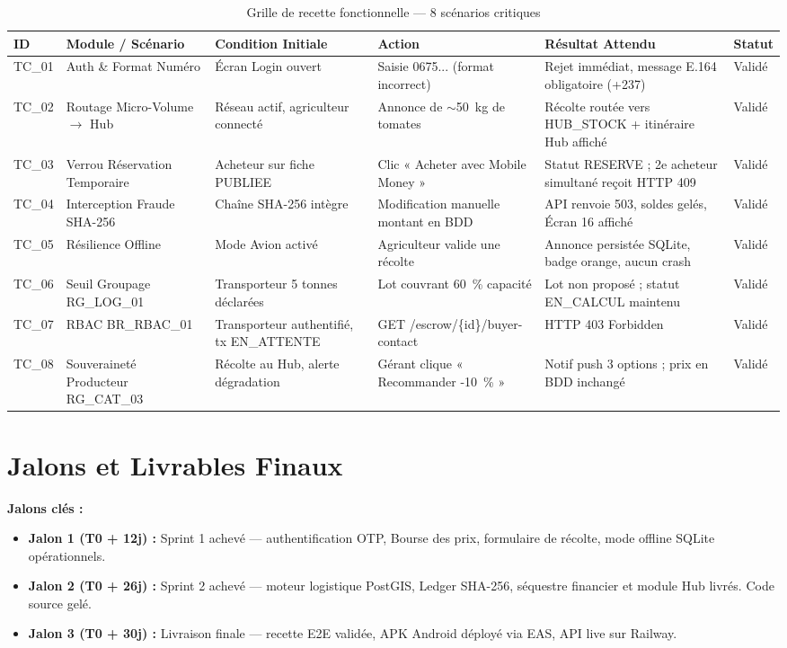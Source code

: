 \documentclass[12pt,a4paper]{report}
\begin{document}
\begin{table}[H]
\centering
\caption{Grille de recette fonctionnelle — 8 scénarios critiques}
\scriptsize
\begin{tabularx}{\textwidth}{C{1cm} L{2.8cm} L{2.5cm} L{2.5cm} L{3cm} C{1.2cm}}
\toprule
\textbf{ID} & \textbf{Module / Scénario} & \textbf{Condition Initiale} & \textbf{Action} & \textbf{Résultat Attendu} & \textbf{Statut} \\
\midrule
TC\_01 & Auth \& Format Numéro & Écran Login ouvert & Saisie 0675... (format incorrect) & Rejet immédiat, message E.164 obligatoire (+237) & Validé \\
TC\_02 & Routage Micro-Volume $\to$ Hub & Réseau actif, agriculteur connecté & Annonce de $\sim$50~kg de tomates & Récolte routée vers HUB\_STOCK + itinéraire Hub affiché & Validé \\
TC\_03 & Verrou Réservation Temporaire & Acheteur sur fiche PUBLIEE & Clic « Acheter avec Mobile Money » & Statut RESERVE ; 2e acheteur simultané reçoit HTTP 409 & Validé \\
TC\_04 & Interception Fraude SHA-256 & Chaîne SHA-256 intègre & Modification manuelle montant en BDD & API renvoie 503, soldes gelés, Écran 16 affiché & Validé \\
TC\_05 & Résilience Offline & Mode Avion activé & Agriculteur valide une récolte & Annonce persistée SQLite, badge orange, aucun crash & Validé \\
TC\_06 & Seuil Groupage RG\_LOG\_01 & Transporteur 5 tonnes déclarées & Lot couvrant 60~\% capacité & Lot non proposé ; statut EN\_CALCUL maintenu & Validé \\
TC\_07 & RBAC BR\_RBAC\_01 & Transporteur authentifié, tx EN\_ATTENTE & GET /escrow/\{id\}/buyer-contact & HTTP 403 Forbidden & Validé \\
TC\_08 & Souveraineté Producteur RG\_CAT\_03 & Récolte au Hub, alerte dégradation & Gérant clique « Recommander -10~\% » & Notif push 3 options ; prix en BDD inchangé & Validé \\
\bottomrule
\end{tabularx}
\end{table}

\section{Jalons et Livrables Finaux}

\textbf{Jalons clés :}
\begin{itemize}
  \item \textbf{Jalon 1 (T0 + 12j) :} Sprint 1 achevé — authentification OTP, Bourse des prix, formulaire de récolte, mode offline SQLite opérationnels.
  \item \textbf{Jalon 2 (T0 + 26j) :} Sprint 2 achevé — moteur logistique PostGIS, Ledger SHA-256, séquestre financier et module Hub livrés. Code source gelé.
  \item \textbf{Jalon 3 (T0 + 30j) :} Livraison finale — recette E2E validée, APK Android déployé via EAS, API live sur Railway.
\end{itemize}
\end{document}
